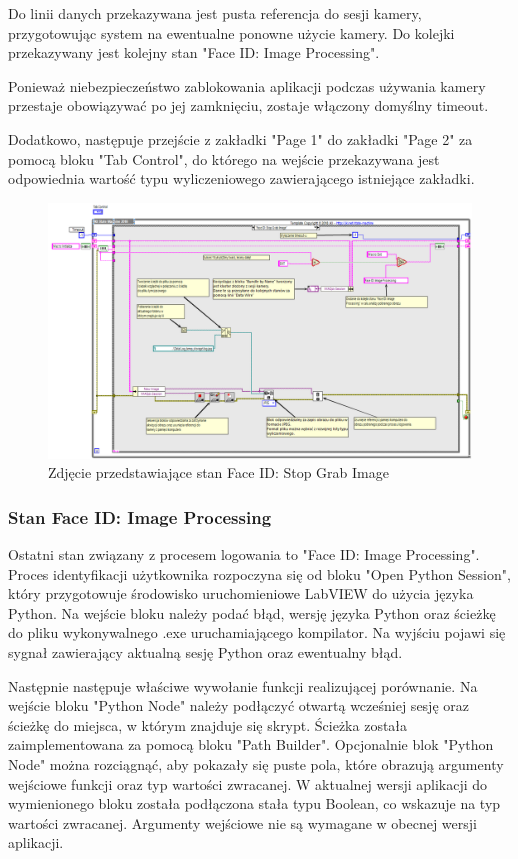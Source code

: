 \documentclass{report}
\begin{document}
Do linii danych przekazywana jest pusta referencja do sesji kamery, przygotowując system na ewentualne ponowne użycie kamery. Do kolejki przekazywany jest kolejny stan "Face ID: Image Processing".

Ponieważ niebezpieczeństwo zablokowania aplikacji podczas używania kamery przestaje obowiązywać po jej zamknięciu, zostaje włączony domyślny timeout.

Dodatkowo, następuje przejście z zakładki "Page 1" do zakładki "Page 2" za pomocą bloku "Tab Control", do którego na wejście przekazywana jest odpowiednia wartość typu wyliczeniowego zawierającego istniejące zakładki.


\begin{figure}[H]
    \centering
    \includegraphics[width=1.0\textwidth]{src/face-id/face-id-stop-grab.png}
    \caption{Zdjęcie przedstawiające stan Face ID: Stop Grab Image}
    \label{fig:face_id-stop-grab}
\end{figure}

\subsubsection{\large Stan Face ID: Image Processing}

Ostatni stan związany z procesem logowania to "Face ID: Image Processing". Proces identyfikacji użytkownika rozpoczyna się od bloku "Open Python Session", który przygotowuje środowisko uruchomieniowe LabVIEW do użycia języka Python. Na wejście bloku należy podać błąd, wersję języka Python oraz ścieżkę do pliku wykonywalnego .exe uruchamiającego kompilator. Na wyjściu pojawi się sygnał zawierający aktualną sesję Python oraz ewentualny błąd.

Następnie następuje właściwe wywołanie funkcji realizującej porównanie. Na wejście bloku "Python Node" należy podłączyć otwartą wcześniej sesję oraz ścieżkę do miejsca, w którym znajduje się skrypt. Ścieżka została zaimplementowana za pomocą bloku "Path Builder". Opcjonalnie blok "Python Node" można rozciągnąć, aby pokazały się puste pola, które obrazują argumenty wejściowe funkcji oraz typ wartości zwracanej. W aktualnej wersji aplikacji do wymienionego bloku została podłączona stała typu Boolean, co wskazuje na typ wartości zwracanej. Argumenty wejściowe nie są wymagane w obecnej wersji aplikacji.
\end{document}
